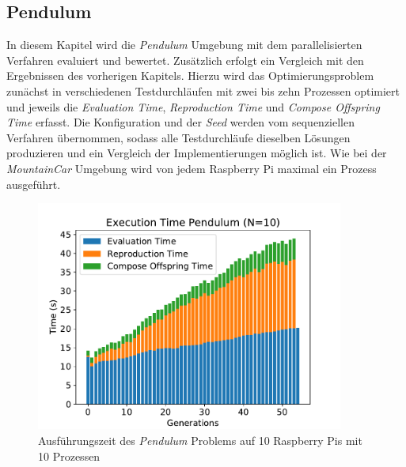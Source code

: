 \subsection{Pendulum}
In diesem Kapitel wird die \emph{Pendulum} Umgebung mit dem parallelisierten Verfahren evaluiert und bewertet. Zusätzlich erfolgt ein Vergleich mit den Ergebnissen des vorherigen Kapitels. Hierzu wird das Optimierungsproblem zunächst in verschiedenen Testdurchläufen mit zwei bis zehn Prozessen optimiert und jeweils die \emph{Evaluation Time}, \emph{Reproduction Time} und \emph{Compose Offspring Time} erfasst. Die Konfiguration und der \emph{Seed} werden vom sequenziellen Verfahren übernommen, sodass alle Testdurchläufe dieselben Lösungen produzieren und ein Vergleich der Implementierungen möglich ist. Wie bei der \emph{MountainCar} Umgebung wird von jedem Raspberry Pi maximal ein Prozess ausgeführt. 
\begin{figure}[!htb]
	\centering
	\includegraphics[width=0.9\textwidth]{./img/pendulum_analysis/pendulum_time_1_10core_10pi.pdf} 
	\caption{Ausführungszeit des \emph{Pendulum} Problems auf 10 Raspberry Pis mit 10 Prozessen}
	\label{fig:pendulum_time_10cores_10pi}
\end{figure}
\\\\
